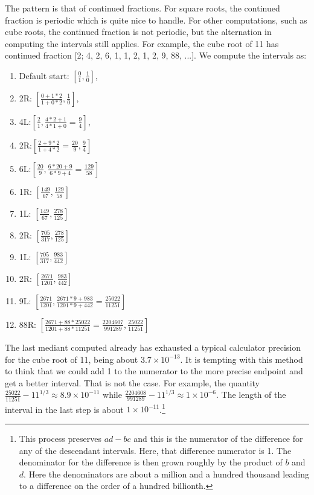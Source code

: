 \documentclass[12pt]{article}
\begin{document}
The pattern is that of continued fractions. For square roots, the continued fraction is periodic which is quite nice to handle. For other computations, such as cube roots, the continued fraction is not periodic, but the alternation in computing the intervals still applies. For example, the cube root of 11 has continued fraction [2; 4, 2, 6, 1, 1, 2, 1, 2, 9, 88, ...]. We compute the intervals as:  
\begin{enumerate}
\item Default start: $[\frac{0}{1}, \frac{1}{0}]$, 
\item 2R: $[\frac{0+1*2}{1+0*2}, \frac{1}{0}]$, 
\item 4L:$[\frac{2}{1}, \frac{4*2+1}{4*1+0} =\frac{9}{4}]$, 
\item 2R:$[\frac{2+9*2}{1+4*2} = \frac{20}{9}, \frac{9}{4}]$
\item 6L:$[\frac{20}{9}, \frac{6*20+9}{6*9 + 4} = \frac{129}{58}]$
\item 1R: $[\frac{149}{67}, \frac{129}{58}]$
\item 1L: $[\frac{149}{67}, \frac{278}{125}]$
\item 2R: $[\frac{705}{317}, \frac{278}{125}]$
\item 1L: $[\frac{705}{317}, \frac{983}{442}]$
\item 2R: $[\frac{2671}{1201}, \frac{983}{442}]$
\item 9L: $[\frac{2671}{1201}, \frac{2671*9+983}{1201*9+442} = \frac{25022}{11251}]$
\item 88R: $[\frac{2671+88*25022}{1201+88*11251} = \frac{2204607}{991289}, \frac{25022}{11251}]$
\end{enumerate}

The last mediant computed already has exhausted a typical calculator precision for the cube root of 11, being about $3.7\times 10^{-13}$. It is tempting with this method to think that we could add 1 to the numerator to the more precise endpoint and get a better interval. That is not the case. For example, the quantity $\frac{25022}{11251} - 11^{1/3} \approx 8.9\times 10^{-11}$ while $\frac{2204608}{991289} - 11^{1/3} \approx 1\times10^{-6}$. The length of the interval in the last step is about $1\times10^{-11}$.\footnote{This process preserves $ad -bc$ and this is the numerator of the difference for any of the descendant intervals. Here, that difference numerator is 1. The denominator for the difference is then grown roughly by the product of $b$ and $d$. Here the denominators are about a million and a hundred thousand leading to a difference on the order of a hundred billionth.} 
\end{document}
